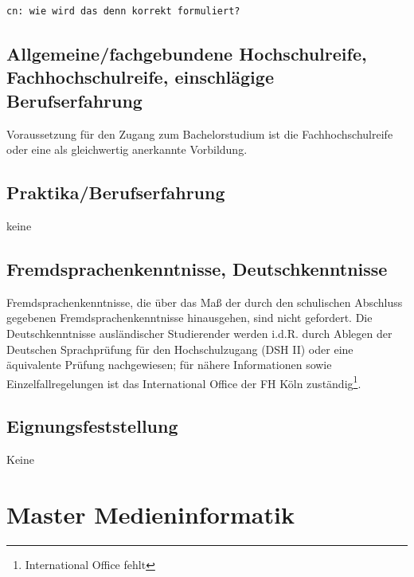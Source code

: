 \begin{verbatim}
cn: wie wird das denn korrekt formuliert?
\end{verbatim}

\subsection{Allgemeine/fachgebundene Hochschulreife,
Fachhochschulreife, einschlägige
Berufserfahrung}\label{allgemeinefachgebundene-hochschulreife-fachhochschulreife-einschluxe4gige-berufserfahrung}

Voraussetzung für den Zugang zum Bachelorstudium ist die
Fachhochschulreife oder eine als gleichwertig anerkannte Vorbildung.

\subsection{Praktika/Berufserfahrung}\label{praktikaberufserfahrung}

keine

\subsection{Fremdsprachenkenntnisse,
Deutschkenntnisse}\label{fremdsprachenkenntnisse-deutschkenntnisse}

Fremdsprachenkenntnisse, die über das Maß der durch den schulischen
Abschluss gegebenen Fremdsprachenkenntnisse hinausgehen, sind nicht
gefordert. Die Deutschkenntnisse ausländischer Studierender werden
i.d.R. durch Ablegen der Deutschen Sprachprüfung für den Hochschulzugang
(DSH II) oder eine äquivalente Prüfung nachgewiesen; für nähere
Informationen sowie Einzelfallregelungen ist das International Office
der FH Köln zuständig\footnote{International Office fehlt}.

\subsection{Eignungsfeststellung}\label{eignungsfeststellung}

Keine

\section{Master Medieninformatik}\label{master-medieninformatik-1}

